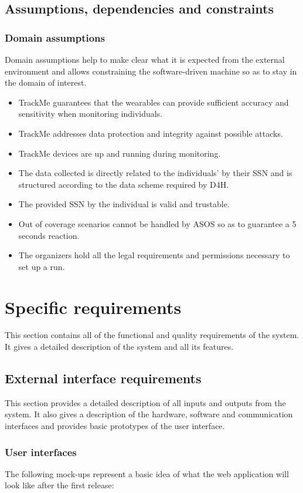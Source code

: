 \documentclass[hidelinks, 12pt]{report}
\newcommand\assumption[1]{\item[{[D#1]}] }
\begin{document}
	\section{Assumptions, dependencies and constraints}
	\subsection{Domain assumptions}
	Domain assumptions help to make clear what it is expected from the external environment and allows constraining the software-driven machine so as to stay in the domain of interest.
	\begin{itemize}
		\assumption{1} TrackMe guarantees that the wearables can provide sufficient accuracy and sensitivity when monitoring individuals.
		\assumption{2} TrackMe addresses data protection and integrity against possible attacks.
		\assumption{3} TrackMe devices are up and running during monitoring.
		\assumption{4} The data collected is directly related to the individuals' by their SSN and is structured according to the data scheme required by D4H.
		\assumption{5} The provided SSN by the individual is valid and trustable.
		\assumption{6} Out of coverage scenarios cannot be handled by ASOS so as to guarantee a 5 seconds reaction.
		\assumption{7} The organizers hold all the legal requirements and permissions necessary to set up a run.
	\end{itemize}
	
	\chapter{Specific requirements}
	This section contains all of the functional and quality requirements of the system. It gives a detailed
	description of the system and all its features.
	
	\section{External interface requirements}
	This section provides a detailed description of all inputs and outputs from the system. It also gives a
	description of the hardware, software and communication interfaces and provides basic prototypes of the
	user interface.
	
	\subsection{User interfaces}
	The following mock-ups represent a basic idea of what the web application will look like after the first release:\\\\
	
\end{document}
